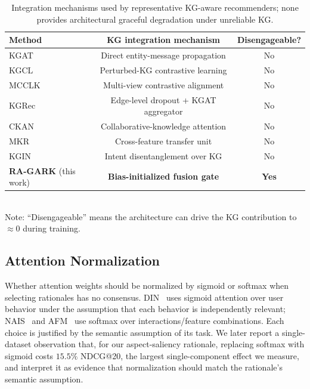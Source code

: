 \documentclass[12pt,a4paper]{article}
\begin{document}
\begin{table}[H]
\centering
\caption{Integration mechanisms used by representative KG-aware recommenders; none provides architectural graceful degradation under unreliable KG.}
\label{tab:gap}
\small
\begin{tabular}{lcc}
\toprule
Method & KG integration mechanism & Disengageable? \\
\midrule
KGAT~\cite{wang2019kgat}   & Direct entity-message propagation     & No \\
KGCL~\cite{yang2022kgcl}   & Perturbed-KG contrastive learning     & No \\
MCCLK~\cite{zou2022mcclk}  & Multi-view contrastive alignment      & No \\
KGRec~\cite{yang2023kgrec} & Edge-level dropout + KGAT aggregator  & No \\
CKAN~\cite{wang2020ckan}   & Collaborative-knowledge attention     & No \\
MKR~\cite{wang2019mkr}     & Cross-feature transfer unit           & No \\
KGIN~\cite{wang2021kgin}   & Intent disentanglement over KG        & No \\
\midrule
\textbf{RA-GARK} (this work) & \textbf{Bias-initialized fusion gate} & \textbf{Yes} \\
\bottomrule
\end{tabular}
\\[0.3em]
{\footnotesize Note: ``Disengageable'' means the architecture can drive the KG contribution to $\approx 0$ during training.}
\end{table}

\subsection{Attention Normalization}

Whether attention weights should be normalized by sigmoid or softmax when selecting rationales has no consensus. DIN~\cite{zhou2018din} uses sigmoid attention over user behavior under the assumption that each behavior is independently relevant; NAIS~\cite{he2018nais} and AFM~\cite{xiao2017afm} use softmax over interactions/feature combinations. Each choice is justified by the semantic assumption of its task. We later report a single-dataset observation that, for our aspect-saliency rationale, replacing softmax with sigmoid costs $15.5\%$ NDCG@20, the largest single-component effect we measure, and interpret it as evidence that normalization should match the rationale's semantic assumption.
\end{document}
